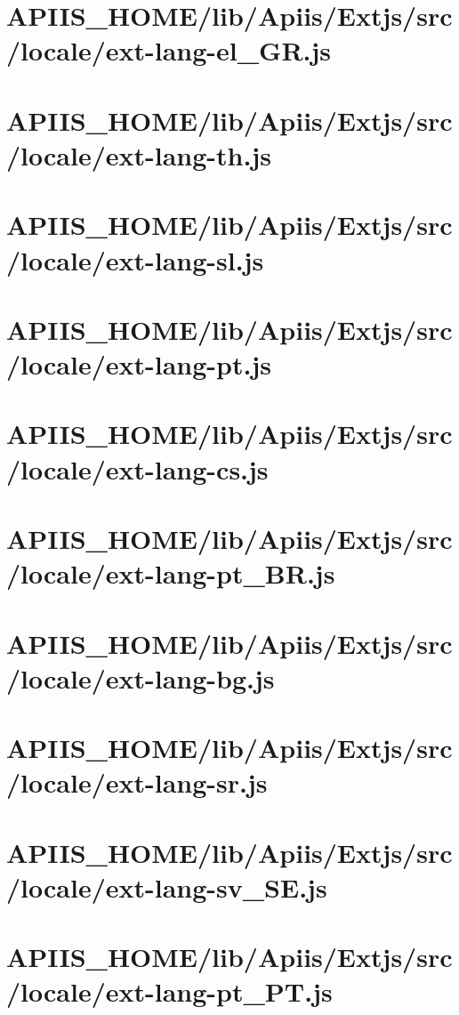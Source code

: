 \section{APIIS\_HOME/lib/Apiis/Extjs/src/locale/ext-lang-el\_GR.js} 
\section{APIIS\_HOME/lib/Apiis/Extjs/src/locale/ext-lang-th.js} 
\section{APIIS\_HOME/lib/Apiis/Extjs/src/locale/ext-lang-sl.js} 
\section{APIIS\_HOME/lib/Apiis/Extjs/src/locale/ext-lang-pt.js} 
\section{APIIS\_HOME/lib/Apiis/Extjs/src/locale/ext-lang-cs.js} 
\section{APIIS\_HOME/lib/Apiis/Extjs/src/locale/ext-lang-pt\_BR.js} 
\section{APIIS\_HOME/lib/Apiis/Extjs/src/locale/ext-lang-bg.js} 
\section{APIIS\_HOME/lib/Apiis/Extjs/src/locale/ext-lang-sr.js} 
\section{APIIS\_HOME/lib/Apiis/Extjs/src/locale/ext-lang-sv\_SE.js} 
\section{APIIS\_HOME/lib/Apiis/Extjs/src/locale/ext-lang-pt\_PT.js} 
